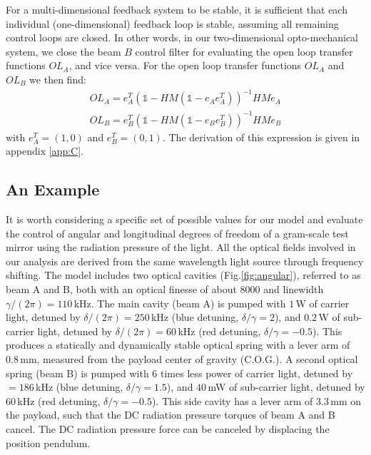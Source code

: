 \documentclass[%
 reprint,
 amsmath,amssymb,
 aps,
]{revtex4-1}
\begin{document}
For a multi-dimensional feedback system to be stable, it is sufficient that each individual (one-dimensional) feedback loop is stable, assuming all remaining control loops are closed. In other words, in our two-dimensional opto-mechanical system, we close the beam $B$ control filter for evaluating the open loop transfer functions $OL_{A}$, and vice versa. For the open loop transfer functions $OL_{A}$ and $OL_{B}$ we then find: 
\begin{eqnarray}
\label{eq:2dol}
OL_{A}=e_A^{T}\left(\mathds{1}-HM (\mathds{1} - e_A e_A^T) \right)^{-1}HMe_A  \\
OL_{B}=e_B^{T}\left(\mathds{1}-HM (\mathds{1} - e_B e_B^T) \right)^{-1}HMe_B \nonumber
\end{eqnarray}
with $e_A^T=(1,0)$ and $e_B^T=(0,1)$. The derivation of this expression is given in appendix \ref{app:C}.




\subsection{An Example}

It is worth considering a specific set of possible values for our model and evaluate the control of  angular and longitudinal degrees of freedom of a gram-scale test mirror using the radiation pressure of the light.
All the optical fields involved in our analysis are derived from the same wavelength light source through frequency shifting.
The model includes two optical cavities (Fig.\ref{fig:angular}), referred to as beam A and B, both with an optical finesse of  about $8000$ and linewidth $\gamma/(2 \pi) = 110\,$kHz. 
The main cavity (beam A) is pumped with $1\,$W of carrier light, detuned by $\delta/(2 \pi)= 250\,$kHz (blue detuning, $\delta/\gamma = 2$), and $0.2\,$W of sub-carrier light, detuned by $\delta/(2 \pi) =60\,$kHz (red detuning, $\delta/\gamma = -0.5$). This produces a statically and dynamically stable optical spring with a lever arm of $0.8\,$mm, measured from the payload center of gravity (C.O.G.). A second optical spring (beam B) is pumped with 6 times less power of carrier light, detuned by $=186\,$kHz (blue detuning, $\delta/\gamma=1.5$), and $40\,$mW of sub-carrier light, detuned by $60\,$kHz (red detuning, $\delta/\gamma=-0.5$). This side cavity has a lever arm of $3.3\,$mm on the payload, such that the DC radiation pressure torques of beam A and B cancel. The DC radiation pressure force can be canceled by displacing the position pendulum.
\end{document}
